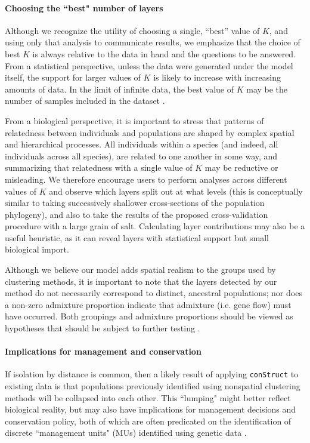 \documentclass[12pt]{article}
\begin{document}
\paragraph{Choosing the ``best" number of layers}
Although we recognize the utility of choosing a single, ``best'' value of $K$, 
and using only that analysis to communicate results, 
we emphasize that 
the choice of best $K$ is always relative to the data in hand
and the questions to be answered.
From a statistical perspective, unless the data were generated under the model itself,
the support for larger values of $K$ is likely to increase with increasing amounts of data.
In the limit of infinite data, the best value of $K$ 
may be the number of samples included in the dataset \citep{Patterson2006}.

From a biological perspective, 
it is important to stress that patterns of relatedness between individuals and populations 
are shaped by complex spatial and hierarchical processes.
All individuals within a species (and indeed, all individuals across all species), 
are related to one another in some way, 
and summarizing that relatedness with a single value of $K$ may be reductive or misleading.
We therefore encourage users to perform analyses across different values of $K$ and 
observe which layers split out at what levels 
(this is conceptually similar to taking successively shallower
cross-sections of the population phylogeny), 
and also to take the results of the proposed cross-validation procedure with a large grain of salt.
Calculating layer contributions may also be a useful heuristic, 
as it can reveal layers with statistical support but small biological import.

Although we believe our model adds spatial realism to the groups used by clustering methods,
it is important to note that the layers detected by our method 
do not necessarily correspond  to distinct, ancestral populations; 
nor does a non-zero admixture proportion indicate that admixture 
(i.e. gene flow) must have occurred. 
Both groupings and admixture proportions
should be viewed as hypotheses that should be subject to further testing
\citep[see][for an in-depth discussion of these points]{Falush:16}.

\paragraph{Implications for management and conservation}
If isolation by distance is common, 
then a likely result of applying \texttt{conStruct} to existing data is that 
populations previously identified using nonspatial clustering methods 
will be collapsed into each other.  
This ``lumping" might better reflect biological reality, 
but may also have implications for management decisions and conservation policy, 
both of which are often predicated on the identification of discrete ``management units" (MUs) 
identified using genetic data \citep{Moritz1994,Waples_1998,Moritz_etal_2002}.
\end{document}

